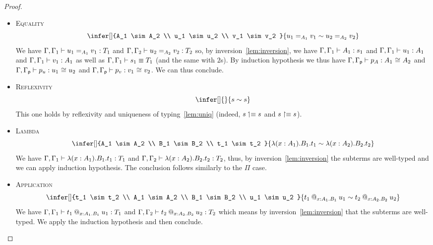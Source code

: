 \begin{proof}
\begin{itemize}
    \item \textsc{Equality}
    \[
      \infer[]
        {A_1 \sim A_2 \\
         u_1 \sim u_2 \\
         v_1 \sim v_2
        }
        {\Eq{A_1}{u_1}{v_1} \sim \Eq{A_2}{u_2}{v_2}}
    \]
    We have $\isterm{\Ga, \Ga_1}{\Eq{A_1}{u_1}{v_1}}{T_1}$ and
    $\isterm{\Ga, \Ga_2}{\Eq{A_2}{u_2}{v_2}}{T_2}$ so, by
    inversion~\eqref{lem:inversion}, we have
    $\isterm{\Ga, \Ga_1}{A_1}{s_1}$ and $\isterm{\Ga, \Ga_1}{u_1}{A_1}$ and
    $\isterm{\Ga, \Ga_1}{v_1}{A_1}$ as well as $\eqtype{\Ga, \Ga_1}{s_1}{T_1}$
    (and the same with $2$s). By induction hypothesis we thus have
    $\isterm{\Ga, \Gp}{p_{A}}{\Heq{}{A_1}{}{A_2}}$ and
    $\isterm{\Ga, \Gp}{p_u}{\Heq{}{u_1}{}{u_2}}$ and
    $\isterm{\Ga, \Gp}{p_v}{\Heq{}{v_1}{}{v_2}}$.
    We can thus conclude.

    \item \textsc{Reflexivity}
    \[
      \infer[]
        { }
        {s \sim s}
    \]
    This one holds by reflexivity and uniqueness of typing~\eqref{lem:uniq}
    (indeed, $\lo{s} \equiv s$ and $\ro{s} \equiv s$).

    \item \textsc{Lambda}
    \[
      \infer[]
        {A_1 \sim A_2 \\
         B_1 \sim B_2 \\
         t_1 \sim t_2
        }
        {\lam{x:A_1}{B_1} t_1 \sim \lam{x:A_2}{B_2} t_2}
    \]
    We have $\isterm{\Ga, \Ga_1}{\lam{x:A_1}{B_1} t_1}{T_1}$ and
    $\isterm{\Ga, \Ga_2}{\lam{x:A_2}{B_2} t_2}{T_2}$, thus, by
    inversion~\ref{lem:inversion} the subterms are well-typed and we can
    apply induction hypothesis. The conclusion follows similarly to the $\Pi$
    case.

    \item \textsc{Application}
    \[
      \infer[]
        {t_1 \sim t_2 \\
         A_1 \sim A_2 \\
         B_1 \sim B_2 \\
         u_1 \sim u_2
        }
        {\app{t_1}{x:A_1}{B_1}{u_1} \sim \app{t_2}{x:A_2}{B_2}{u_2}}
    \]
    We have $\isterm{\Ga, \Ga_1}{\app{t_1}{x:A_1}{B_1}{u_1}}{T_1}$ and
    $\isterm{\Ga, \Ga_2}{\app{t_2}{x:A_2}{B_2}{u_2}}{T_2}$ which means by
    inversion~\eqref{lem:inversion} that the subterms are well-typed.
    We apply the induction hypothesis and then conclude.


\end{itemize}
\end{proof}

